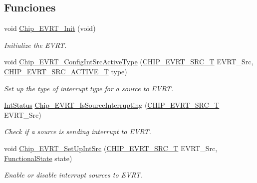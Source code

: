 \subsection*{Funciones}
\begin{DoxyCompactItemize}
\item 
void \hyperlink{group___e_v_r_t__18_x_x__43_x_x_ga5320424173f844bb1484ae1523e3454a}{Chip\+\_\+\+E\+V\+R\+T\+\_\+\+Init} (void)
\begin{DoxyCompactList}\small\item\em Initialize the E\+V\+RT. \end{DoxyCompactList}\item 
void \hyperlink{group___e_v_r_t__18_x_x__43_x_x_ga4a317e0d292116144f6a6951c0bf25fa}{Chip\+\_\+\+E\+V\+R\+T\+\_\+\+Config\+Int\+Src\+Active\+Type} (\hyperlink{group___e_v_r_t__18_x_x__43_x_x_gaa43c01b5839b8ef001017d1d1150b16d}{C\+H\+I\+P\+\_\+\+E\+V\+R\+T\+\_\+\+S\+R\+C\+\_\+T} E\+V\+R\+T\+\_\+\+Src, \hyperlink{group___e_v_r_t__18_x_x__43_x_x_ga41e06d681302344e72fc1eca77f708b4}{C\+H\+I\+P\+\_\+\+E\+V\+R\+T\+\_\+\+S\+R\+C\+\_\+\+A\+C\+T\+I\+V\+E\+\_\+T} type)
\begin{DoxyCompactList}\small\item\em Set up the type of interrupt type for a source to E\+V\+RT. \end{DoxyCompactList}\item 
\hyperlink{group___l_p_c___types___public___types_gab7d263072f745b4f3913fb0afc434c4e}{Int\+Status} \hyperlink{group___e_v_r_t__18_x_x__43_x_x_ga48a251beebd268a78fd7ecad4a542a35}{Chip\+\_\+\+E\+V\+R\+T\+\_\+\+Is\+Source\+Interrupting} (\hyperlink{group___e_v_r_t__18_x_x__43_x_x_gaa43c01b5839b8ef001017d1d1150b16d}{C\+H\+I\+P\+\_\+\+E\+V\+R\+T\+\_\+\+S\+R\+C\+\_\+T} E\+V\+R\+T\+\_\+\+Src)
\begin{DoxyCompactList}\small\item\em Check if a source is sending interrupt to E\+V\+RT. \end{DoxyCompactList}\item 
void \hyperlink{group___e_v_r_t__18_x_x__43_x_x_ga4133d67f8986d48e1adbfee519423233}{Chip\+\_\+\+E\+V\+R\+T\+\_\+\+Set\+Up\+Int\+Src} (\hyperlink{group___e_v_r_t__18_x_x__43_x_x_gaa43c01b5839b8ef001017d1d1150b16d}{C\+H\+I\+P\+\_\+\+E\+V\+R\+T\+\_\+\+S\+R\+C\+\_\+T} E\+V\+R\+T\+\_\+\+Src, \hyperlink{group___l_p_c___types___public___types_gac9a7e9a35d2513ec15c3b537aaa4fba1}{Functional\+State} state)
\begin{DoxyCompactList}\small\item\em Enable or disable interrupt sources to E\+V\+RT. \end{DoxyCompactList}\item 

\end{DoxyCompactItemize}
